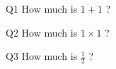  {\begin{question}{Q1}
 How much is $1+1$ ?
 \AMCBoxedAnswers\begin{choices}
 \end{choices}\end{question}
}
 

 {\begin{question}{Q2}
 How much is $1 \times 1$ ?
 \AMCBoxedAnswers\begin{choices}
 \end{choices}\end{question}
}
 

 {\begin{question}{Q3}
 How much is $\frac{1}{2}$ ?
 \AMCBoxedAnswers\begin{choices}
  \end{choices}\end{question}
}
 

